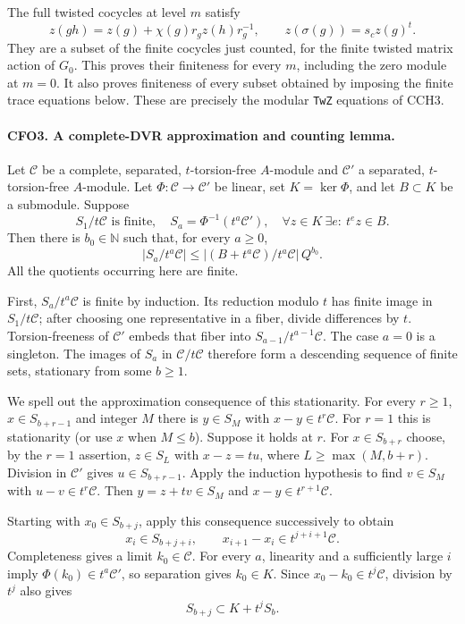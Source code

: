The full twisted cocycles at level $m$ satisfy
\[
 z(gh)=z(g)+\chi(g)r_gz(h)r_g^{-1},\qquad
 z(\sigma(g))=s_c z(g)^t.                                        \tag{CFO.6}
\]
They are a subset of the finite cocycles just counted, for the
finite twisted matrix action of $G_0$.  This proves their
finiteness for every $m$, including the zero module at $m=0$.
It also proves finiteness of every subset obtained by imposing
the finite trace equations below.  These are precisely the
modular \texttt{TwZ} equations of CCH3.

\paragraph{CFO3. A complete-DVR approximation and counting lemma.}
\label{claim:CFO3}
Let $\mathcal C$ be a complete, separated, $t$-torsion-free
$A$-module and $\mathcal C'$ a separated, $t$-torsion-free
$A$-module.  Let $\Phi:\mathcal C\to\mathcal C'$ be linear, set
$K=\ker\Phi$, and let $B\subset K$ be a submodule.  Suppose
\[
 S_1/t\mathcal C\text{ is finite},\quad
 S_a=\Phi^{-1}(t^a\mathcal C'),\quad
 \forall z\in K\ \exists e:\ t^e z\in B.                          \tag{CFO.7}
\]
Then there is $b_0\in\mathbb N$ such that, for every $a\ge0$,
\[
 |S_a/t^a\mathcal C|
 \le |(B+t^a\mathcal C)/t^a\mathcal C|\,Q^{b_0}.                  \tag{CFO.8}
\]
All the quotients occurring here are finite.

First, $S_a/t^a\mathcal C$ is finite by induction.  Its reduction
modulo $t$ has finite image in $S_1/t\mathcal C$; after choosing
one representative in a fiber, divide differences by $t$.
Torsion-freeness of $\mathcal C'$ embeds that fiber into
$S_{a-1}/t^{a-1}\mathcal C$.  The case $a=0$ is a singleton.
The images of $S_a$ in $\mathcal C/t\mathcal C$ therefore form a
descending sequence of finite sets, stationary from some $b\ge1$.

We spell out the approximation consequence of this stationarity.
For every $r\ge1$, $x\in S_{b+r-1}$ and integer $M$ there is
$y\in S_M$ with $x-y\in t^r\mathcal C$.  For $r=1$ this is
stationarity (or use $x$ when $M\le b$).  Suppose it holds at $r$.
For $x\in S_{b+r}$ choose, by the $r=1$ assertion,
$z\in S_L$ with $x-z=t u$, where
$L\ge\max(M,b+r)$.  Division in $\mathcal C'$ gives
$u\in S_{b+r-1}$.  Apply the induction hypothesis to find
$v\in S_M$ with $u-v\in t^r\mathcal C$.
Then $y=z+tv\in S_M$ and $x-y\in t^{r+1}\mathcal C$.

Starting with $x_0\in S_{b+j}$, apply this consequence successively
to obtain
\[
 x_i\in S_{b+j+i},\qquad
 x_{i+1}-x_i\in t^{j+i+1}\mathcal C.
 \]
Completeness gives a limit $k_0\in\mathcal C$.  For every $a$,
linearity and a sufficiently large $i$ imply
$\Phi(k_0)\in t^a\mathcal C'$, so separation gives $k_0\in K$.
Since $x_0-k_0\in t^j\mathcal C$, division by $t^j$ also gives
\[
 S_{b+j}\subset K+t^j S_b.                                      \tag{CFO.9}
\]

